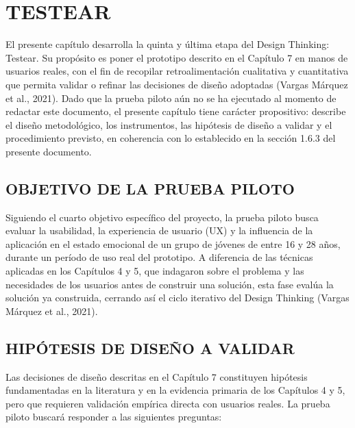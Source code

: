 \chapter{TESTEAR}
El presente capítulo desarrolla la quinta y última etapa del Design Thinking: Testear. Su propósito es poner el prototipo descrito en el Capítulo 7 en manos de usuarios reales, con el fin de recopilar retroalimentación cualitativa y cuantitativa que permita validar o refinar las decisiones de diseño adoptadas (Vargas Márquez et al., 2021). Dado que la prueba piloto aún no se ha ejecutado al momento de redactar este documento, el presente capítulo tiene carácter propositivo: describe el diseño metodológico, los instrumentos, las hipótesis de diseño a validar y el procedimiento previsto, en coherencia con lo establecido en la sección 1.6.3 del presente documento.

\section{OBJETIVO DE LA PRUEBA PILOTO}
Siguiendo el cuarto objetivo específico del proyecto, la prueba piloto busca evaluar la usabilidad, la experiencia de usuario (UX) y la influencia de la aplicación en el estado emocional de un grupo de jóvenes de entre 16 y 28 años, durante un período de uso real del prototipo. A diferencia de las técnicas aplicadas en los Capítulos 4 y 5, que indagaron sobre el problema y las necesidades de los usuarios antes de construir una solución, esta fase evalúa la solución ya construida, cerrando así el ciclo iterativo del Design Thinking (Vargas Márquez et al., 2021).

\section{HIPÓTESIS DE DISEÑO A VALIDAR}
Las decisiones de diseño descritas en el Capítulo 7 constituyen hipótesis fundamentadas en la literatura y en la evidencia primaria de los Capítulos 4 y 5, pero que requieren validación empírica directa con usuarios reales. La prueba piloto buscará responder a las siguientes preguntas:

